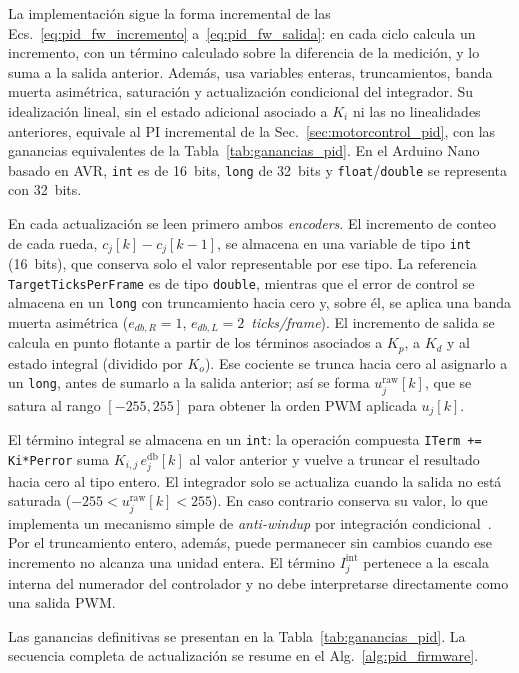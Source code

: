 \begin{appendices}
La implementación sigue la forma incremental de las Ecs.~\eqref{eq:pid_fw_incremento} a~\eqref{eq:pid_fw_salida}: en cada ciclo calcula un incremento, con un término calculado sobre la diferencia de la medición, y lo suma a la salida anterior. Además, usa variables enteras, truncamientos, banda muerta asimétrica, saturación y actualización condicional del integrador. Su idealización lineal, sin el estado adicional asociado a $K_i$ ni las no linealidades anteriores, equivale al PI incremental de la Sec.~\ref{sec:motorcontrol_pid}, con las ganancias equivalentes de la Tabla~\ref{tab:ganancias_pid}. En el Arduino Nano basado en AVR, \texttt{int} es de 16~bits, \texttt{long} de 32~bits y \texttt{float}/\texttt{double} se representa con 32~bits.

En cada actualización se leen primero ambos \textit{encoders}. El incremento de conteo de cada rueda, $c_j[k]-c_j[k-1]$, se almacena en una variable de tipo \texttt{int} (16~bits), que conserva solo el valor representable por ese tipo. La referencia \texttt{TargetTicksPerFrame} es de tipo \texttt{double}, mientras que el error de control se almacena en un \texttt{long} con truncamiento hacia cero y, sobre él, se aplica una banda muerta asimétrica ($e_{db,R}=1$, $e_{db,L}=2$~\textit{ticks/frame}). El incremento de salida se calcula en punto flotante a partir de los términos asociados a $K_p$, a $K_d$ y al estado integral (dividido por $K_o$). Ese cociente se trunca hacia cero al asignarlo a un \texttt{long}, antes de sumarlo a la salida anterior; así se forma $u_j^{\mathrm{raw}}[k]$, que se satura al rango $[-255,255]$ para obtener la orden \gls{PWM} aplicada $u_j[k]$.

El término integral se almacena en un \texttt{int}: la operación compuesta \texttt{ITerm += Ki*Perror} suma $K_{i,j}\,e_j^{\mathrm{db}}[k]$ al valor anterior y vuelve a truncar el resultado hacia cero al tipo entero. El integrador solo se actualiza cuando la salida no está saturada ($-255<u_j^{\mathrm{raw}}[k]<255$). En caso contrario conserva su valor, lo que implementa un mecanismo simple de \textit{anti-windup} por integración condicional~\citep[Sec.~3.5]{astrom2009controlpid}. Por el truncamiento entero, además, puede permanecer sin cambios cuando ese incremento no alcanza una unidad entera. El término $I_j^{\mathrm{int}}$ pertenece a la escala interna del numerador del controlador y no debe interpretarse directamente como una salida PWM.

Las ganancias definitivas se presentan en la
Tabla~\ref{tab:ganancias_pid}. La secuencia completa de actualización se
resume en el Alg.~\ref{alg:pid_firmware}.


\end{appendices}

